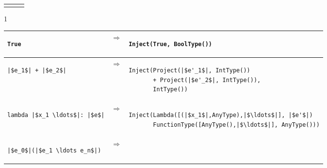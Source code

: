 \documentclass[7x10]{TimesAPriori_MIT}%
\def\pythonEd{1}
\providecommand{\BookEdition}{1}
\let\edition\BookEdition
\newcommand{\pythonColor}[0]{}
\numberwithin{theorem}{chapter}
\numberwithin{definition}{chapter}
\numberwithin{equation}{chapter}
\begin{document}
\begin{figure}[btp]
\begin{tcolorbox}[colback=white]
{\begin{tabular}{lll}
\begin{minipage}{0.65\textwidth}
\end{minipage}
\end{tabular} 
\fi}
{\if\edition\pythonEd\pythonColor
\hspace{-0.8em}\begin{tabular}{|lll|} \hline
\begin{minipage}{0.23\textwidth}
\begin{lstlisting}
True
\end{lstlisting}
\end{minipage}
&
$\Rightarrow$
&
\begin{minipage}{0.7\textwidth}
\begin{lstlisting}
Inject(True, BoolType())
\end{lstlisting}
\end{minipage}
\\[2ex]\hline
\begin{minipage}{0.23\textwidth}
\begin{lstlisting}
|$e_1$| + |$e_2$|
\end{lstlisting}
\end{minipage}
&
$\Rightarrow$
&
\begin{minipage}{0.7\textwidth}
\begin{lstlisting}
Inject(Project(|$e'_1$|, IntType())
       + Project(|$e'_2$|, IntType()),
       IntType())
\end{lstlisting}
\end{minipage}
\\[2ex]\hline
\begin{minipage}{0.23\textwidth}
\begin{lstlisting}
lambda |$x_1 \ldots$|: |$e$|
\end{lstlisting}
\end{minipage}
&
$\Rightarrow$
&
\begin{minipage}{0.7\textwidth}
\begin{lstlisting}
Inject(Lambda([(|$x_1$|,AnyType),|$\ldots$|], |$e'$|)
       FunctionType([AnyType(),|$\ldots$|], AnyType()))
\end{lstlisting}
\end{minipage}
\\[2ex]\hline
\begin{minipage}{0.23\textwidth}
\begin{lstlisting}
|$e_0$|(|$e_1 \ldots e_n$|)
\end{lstlisting}
\end{minipage}
&
$\Rightarrow$
&
\begin{minipage}{0.7\textwidth}
\begin{lstlisting}

\end{lstlisting}
\end{minipage}
\end{tabular}}
\end{tcolorbox}
\end{figure}
\end{document}
